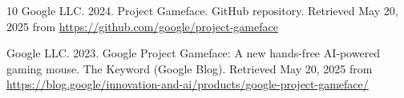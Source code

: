 \documentclass[sigconf]{nimeart}
\begin{document}
\begin{thebibliography}{10}
Google LLC. 2024.
Project Gameface.
GitHub repository.
Retrieved May 20, 2025 from \url{https://github.com/google/project-gameface}

Google LLC. 2023.
Google Project Gameface: A new hands-free AI-powered gaming mouse.
The Keyword (Google Blog).
Retrieved May 20, 2025 from \url{https://blog.google/innovation-and-ai/products/google-project-gameface/}


\end{thebibliography}
\end{document}
